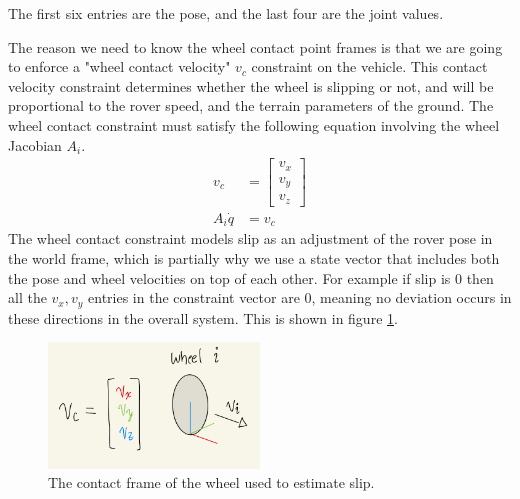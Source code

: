 \documentclass[12pt]{article}
\begin{document}
The first six entries are the pose, and the last four are the joint values. 

The reason we need to know the wheel contact point frames is that we are going to enforce a "wheel contact velocity" $v_c$ constraint on the vehicle. 
This contact velocity constraint determines whether the wheel is slipping or not, and will be proportional to the rover speed, and the terrain parameters of the ground. 
The wheel contact constraint must satisfy the following equation involving the wheel Jacobian $A_i$. 
\begin{align}
    v_c &= \begin{bmatrix}
    v_x \\
    v_y \\
    v_z
    \end{bmatrix}\\
   A_i \dot{q} &= v_c
   \label{eq: wheel contact}
\end{align}
The wheel contact constraint models slip as an adjustment of the rover pose in the world frame, which is partially why we use a state vector that includes both the pose and wheel velocities on top of each other. 
For example if slip is 0 then all the $v_x, v_y$ entries in the constraint vector are 0, meaning no deviation occurs in these directions in the overall system. 
This is shown in figure \ref{fig:contact}.
\begin{figure}
    \centering
    \includegraphics[width=0.5\textwidth]{images/wheel_contact.png}
    \caption{The contact frame of the wheel used to estimate slip.}
    \label{fig:contact}
\end{figure}
\end{document}
